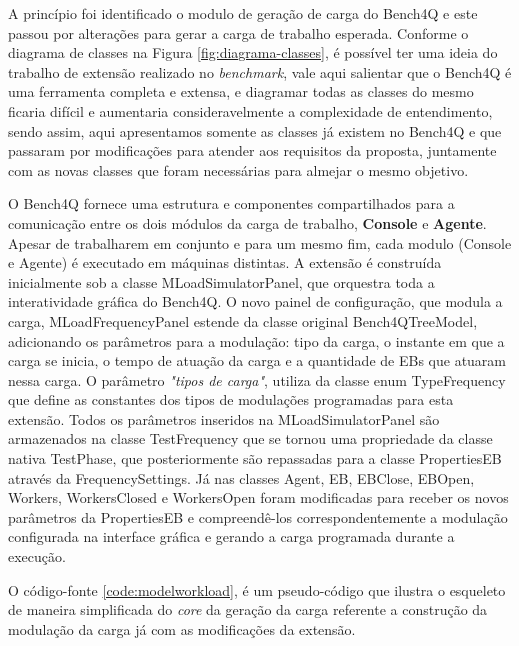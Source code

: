 A princípio foi identificado o modulo de geração de carga do Bench4Q e este passou por alterações para gerar a carga de trabalho esperada. Conforme o diagrama de classes na Figura \ref{fig:diagrama-classes}, é possível ter uma ideia do trabalho de extensão realizado no \textit{benchmark}, vale aqui salientar que o Bench4Q é uma ferramenta completa e extensa, e diagramar todas as classes do mesmo ficaria difícil e aumentaria consideravelmente a complexidade de entendimento, sendo assim, aqui apresentamos somente as classes já existem no Bench4Q e que passaram por modificações para atender aos requisitos da proposta, juntamente com as novas classes que foram necessárias para almejar o mesmo objetivo.

O Bench4Q fornece uma estrutura e componentes compartilhados para a comunicação entre os dois módulos da carga de trabalho, \textbf{Console} e \textbf{Agente}. Apesar de trabalharem em conjunto e para um mesmo fim, cada modulo (Console e Agente) é executado em máquinas distintas.  A extensão é construída inicialmente sob a classe \textsf{MLoadSimulatorPanel}, que orquestra toda a interatividade gráfica do Bench4Q. O novo painel de configuração, que modula a carga, \textsf{MLoadFrequencyPanel} estende da classe original \textsf{Bench4QTreeModel}, adicionando os parâmetros para a modulação: tipo da carga, o instante em que a carga se inicia, o tempo de atuação da carga e a quantidade de EBs que atuaram nessa carga. O parâmetro \textit{"tipos de carga"}, utiliza da classe enum \textsf{TypeFrequency} que define as constantes dos tipos de modulações programadas para esta extensão.  Todos os parâmetros inseridos na \textsf{MLoadSimulatorPanel} são armazenados na classe \textsf{TestFrequency} que se tornou uma propriedade da classe nativa \textsf{TestPhase}, que posteriormente são repassadas para a classe \textsf{PropertiesEB} através da \textsf{FrequencySettings}. Já nas classes \textsf{Agent}, \textsf{EB}, \textsf{EBClose}, \textsf{EBOpen}, \textsf{Workers}, \textsf{WorkersClosed} e \textsf{WorkersOpen} foram modificadas para receber os novos parâmetros da \textsf{PropertiesEB} e compreendê-los correspondentemente a modulação configurada na interface gráfica e gerando a carga programada durante a execução.

O código-fonte \ref{code:modelworkload}, é um pseudo-código que ilustra o esqueleto de maneira simplificada do \textit{core} da geração da carga referente a construção da modulação da carga já com as modificações da extensão.

